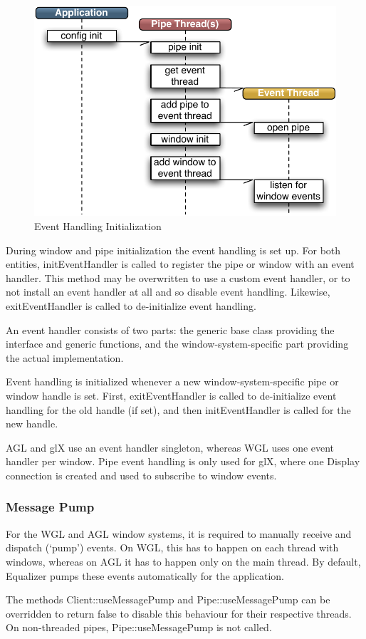 \documentclass[10pt,a4]{scrartcl}
\begin{document}
\begin{figure}
  \includegraphics[width=.382\textwidth]{images/eventInit.pdf}
  {\caption{\small\label{fEventInit}Event Handling Initialization}}
\end{figure}
During window and pipe initialization the event handling is set up. For
both entities, \textsf{initEvent\-Handler} is called to register the
pipe or window with an event handler. This method may be overwritten to
use a custom event handler, or to not install an event handler at all
and so disable event handling. Likewise, \textsf{exitEventHandler} is
called to de-initialize event handling.

An event handler consists of two parts: the generic base class providing
the interface and generic functions, and the window-system-specific
part providing the actual implementation. 

Event handling is initialized whenever a new window-system-specific
pipe or window handle is set. First, \textsf{exitEventHandler} is called
to de-initialize event handling for the old handle (if set), and then
\textsf{initEvent\-Handler} is called for the new handle. 

AGL and glX use an event handler singleton, whereas WGL uses one event
handler per window. Pipe event handling is only used for glX, where one
\textsf{Display} connection is created and used to subscribe to window
events.

\subsubsection{Message Pump}

For the WGL and AGL window systems, it is required to manually receive and
dispatch (`pump') events. On WGL, this has to happen on each thread with
windows, whereas on AGL it has to happen only on the main thread. By
default, Equalizer pumps these events automatically for the application.

The methods \textsf{Client::useMessagePump} and
\textsf{Pipe::useMessagePump} can be overridden to return \textsf{false}
to disable this behaviour for their respective threads. On non-threaded
pipes, \textsf{Pipe::useMessagePump} is not called.
\end{document}
